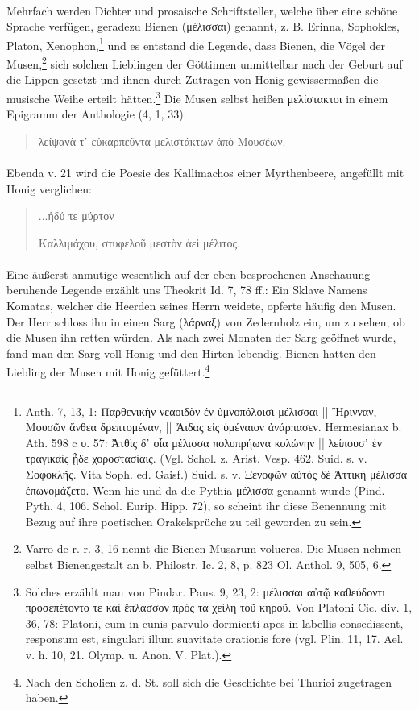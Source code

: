 \documentclass[a4paper, 11pt, oneside]{article}
\begin{document}
\paragraph{}
Mehrfach werden Dichter und prosaische Schriftsteller, welche über eine schöne Sprache verfügen, geradezu Bienen (μέλισσαι) genannt, z. B. Erinna, Sophokles, Platon, Xenophon,\footnote{Anth. 7, 13, 1: Παρθενικὴν νεαοιδὸν ἐν ὑμνοπόλοισι μέλισσαι || Ἤρινναν, Μουσῶν ἄνθεα δρεπτομέναν, || Ἅιδας εἰς ὑμέναιον ἀνάρπασεν. Hermesianax b. Ath. 598 c υ. 57: Ἀτθὶς δ᾽ οἷα μέλισσα πολυπρήωνα κολώνην || λείπουσ᾽ ἐν τραγικαὶς ᾖδε χοροστασίαις. (Vgl. Schol. z. Arist. Vesp. 462. Suid. s. v. Σοφοκλῆς. Vita Soph. ed. Gaisf.) Suid. s. v. Ξενοφῶν αὐτὸς δὲ Ἀττικὴ μέλισσα ἐπωνομάζετο. Wenn hie und da die Pythia μέλισσα genannt wurde (Pind. Pyth. 4, 106. Schol. Eurip. Hipp. 72), so scheint ihr diese Benennung mit Bezug auf ihre poetischen Orakelsprüche zu teil geworden zu sein.} und es entstand die Legende, dass Bienen, die Vögel der Musen,\footnote{Varro de r. r. 3, 16 nennt die Bienen Musarum volucres. Die Musen nehmen selbst Bienengestalt an b. Philostr. Ic. 2, 8, p. 823 Ol. Anthol. 9, 505, 6.} sich solchen Lieblingen der Göttinnen unmittelbar nach der Geburt auf die Lippen gesetzt und ihnen durch Zutragen von Honig gewissermaßen die musische Weihe erteilt hätten.\footnote{Solches erzählt man von Pindar. Paus. 9, 23, 2: μέλισσαι αὐτῷ καθεύδοντι προσεπέτοντο τε καὶ ἔπλασσον πρὸς τὰ χείλη τοῦ κηροῦ. Von Platoni Cic. div. 1, 36, 78: Platoni, cum in cunis parvulo dormienti apes in labellis consedissent, responsum est, singulari illum suavitate orationis fore (vgl. Plin. 11, 17. Ael. v. h. 10, 21. Olymp. u. Anon. V. Plat.).} Die Musen selbst heißen μελίστακτοι in einem Epigramm der Anthologie (4, 1, 33):
\begin{quotation}
λείψανὰ τ᾽ εὐκαρπεῦντα μελιστάκτων ἀπὸ Μουσέων.
\end{quotation}
\paragraph{}
Ebenda v. 21 wird die Poesie des Kallimachos einer Myrthenbeere, angefüllt mit Honig verglichen:
\begin{quotation}
...ἡδύ τε μύρτον

Καλλιμάχου, στυφελοῦ μεστὸν ἀεὶ μέλιτος.
\end{quotation}
\paragraph{}
Eine äußerst anmutige wesentlich auf der eben besprochenen Anschauung beruhende Legende erzählt uns Theokrit Id. 7, 78 ff.: Ein Sklave Namens Komatas, welcher die Heerden seines Herrn weidete, opferte häufig den Musen. Der Herr schloss ihn in einen Sarg (λάρναξ) von Zedernholz ein, um zu sehen, ob die Musen ihn retten würden. Als nach zwei Monaten der Sarg geöffnet wurde, fand man den Sarg voll Honig und den Hirten lebendig. Bienen hatten den Liebling der Musen mit Honig gefüttert.\footnote{Nach den Scholien z. d. St. soll sich die Geschichte bei Thurioi zugetragen haben.}
\end{document}
